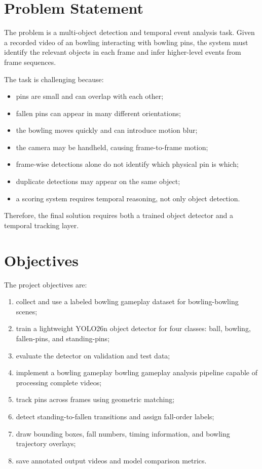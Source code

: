 \documentclass[12pt,a4paper]{article}
\begin{document}
\section{Problem Statement}

The problem is a multi-object detection and temporal event analysis task. Given a recorded video of an bowling interacting with bowling pins, the system must identify the relevant objects in each frame and infer higher-level events from frame sequences.

The task is challenging because:
\begin{itemize}[noitemsep]
    \item pins are small and can overlap with each other;
    \item fallen pins can appear in many different orientations;
    \item the bowling moves quickly and can introduce motion blur;
    \item the camera may be handheld, causing frame-to-frame motion;
    \item frame-wise detections alone do not identify which physical pin is which;
    \item duplicate detections may appear on the same object;
    \item a scoring system requires temporal reasoning, not only object detection.
\end{itemize}

Therefore, the final solution requires both a trained object detector and a temporal tracking layer.


\section{Objectives}

The project objectives are:
\begin{enumerate}[noitemsep]
    \item collect and use a labeled bowling gameplay dataset for bowling-bowling scenes;
    \item train a lightweight YOLO26n object detector for four classes: ball, bowling, fallen-pins, and standing-pins;
    \item evaluate the detector on validation and test data;
    \item implement a bowling gameplay bowling gameplay analysis pipeline capable of processing complete videos;
    \item track pins across frames using geometric matching;
    \item detect standing-to-fallen transitions and assign fall-order labels;
    \item draw bounding boxes, fall numbers, timing information, and bowling trajectory overlays;
    \item save annotated output videos and model comparison metrics.
\end{enumerate}
\end{document}
